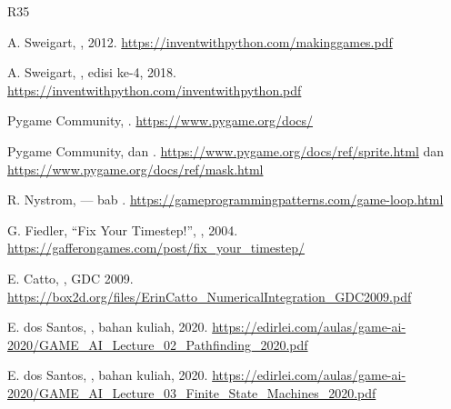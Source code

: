 
\begin{sloppypar}
\begin{thebibliography}{R35}
\setlength{\itemsep}{5pt}

  A. Sweigart, , 2012.
  \url{https://inventwithpython.com/makinggames.pdf}

  A. Sweigart, ,
  edisi ke-4, 2018.
  \url{https://inventwithpython.com/inventwithpython.pdf}

  Pygame Community, . \url{https://www.pygame.org/docs/}

  Pygame Community,  dan
  . \url{https://www.pygame.org/docs/ref/sprite.html} dan
  \url{https://www.pygame.org/docs/ref/mask.html}

  R. Nystrom,  --- bab
  .
  \url{https://gameprogrammingpatterns.com/game-loop.html}

  G. Fiedler, ``Fix Your Timestep!'', , 2004.
  \url{https://gafferongames.com/post/fix_your_timestep/}

  E. Catto, , GDC 2009.
  \url{https://box2d.org/files/ErinCatto_NumericalIntegration_GDC2009.pdf}

  E. dos Santos, , bahan kuliah, 2020.
  \url{https://edirlei.com/aulas/game-ai-2020/GAME_AI_Lecture_02_Pathfinding_2020.pdf}

  E. dos Santos, , bahan kuliah,
  2020.
  \url{https://edirlei.com/aulas/game-ai-2020/GAME_AI_Lecture_03_Finite_State_Machines_2020.pdf}


\end{thebibliography}
\end{sloppypar}
